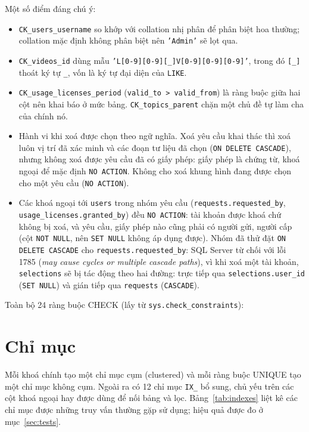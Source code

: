 Một số điểm đáng chú ý:
\begin{itemize}
    \item \texttt{CK\_users\_username} so khớp với collation nhị phân để phân biệt hoa
    thường; collation mặc định không phân biệt nên \texttt{'Admin'} sẽ lọt qua.
    \item \texttt{CK\_videos\_id} dùng mẫu \texttt{'L[0-9][0-9][\_]V[0-9][0-9][0-9]'}, trong
    đó \texttt{[\_]} thoát ký tự \texttt{\_}, vốn là ký tự đại diện của \texttt{LIKE}.
    \item \texttt{CK\_usage\_licenses\_period} (\texttt{valid\_to > valid\_from}) là ràng buộc
    giữa hai cột nên khai báo ở mức bảng. \texttt{CK\_topics\_parent} chặn một chủ đề tự làm
    cha của chính nó.
    \item Hành vi khi xoá được chọn theo ngữ nghĩa. Xoá yêu cầu khai thác thì xoá luôn vị trí
    đã xác minh và các đoạn tư liệu đã chọn (\texttt{ON DELETE CASCADE}), nhưng không xoá được
    yêu cầu đã có giấy phép: giấy phép là chứng từ, khoá ngoại để mặc định \texttt{NO ACTION}.
    Không cho xoá khung hình đang được chọn cho một yêu cầu (\texttt{NO ACTION}).
    \item Các khoá ngoại tới \texttt{users} trong nhóm yêu cầu (\texttt{requests.requested\_by},
    \texttt{usage\_licenses.granted\_by}) đều \texttt{NO ACTION}: tài khoản được khoá chứ không
    bị xoá, và yêu cầu, giấy phép nào cũng phải có người gửi, người cấp (cột \texttt{NOT NULL},
    nên \texttt{SET NULL} không áp dụng được). Nhóm đã thử đặt \texttt{ON DELETE CASCADE} cho
    \texttt{requests.requested\_by}: SQL Server từ chối với lỗi 1785 (\textit{may cause cycles
    or multiple cascade paths}), vì khi xoá một tài khoản, \texttt{selections} sẽ bị tác động
    theo hai đường: trực tiếp qua \texttt{selections.user\_id} (\texttt{SET NULL}) và gián tiếp
    qua \texttt{requests} (\texttt{CASCADE}).
\end{itemize}

Toàn bộ 24 ràng buộc CHECK (lấy từ \texttt{sys.check\_constraints}):

{\small

}

\section{Chỉ mục}

Mỗi khoá chính tạo một chỉ mục cụm (clustered) và mỗi ràng buộc UNIQUE tạo một chỉ mục
không cụm. Ngoài ra có 12 chỉ mục \texttt{IX\_} bổ sung, chủ yếu trên các cột khoá ngoại
hay được dùng để nối bảng và lọc. Bảng~\ref{tab:indexes} liệt kê các chỉ mục được những truy
vấn thường gặp sử dụng; hiệu quả được đo ở mục~\ref{sec:tests}.

